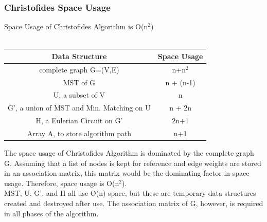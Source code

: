 \documentclass[12pt, oneside]{article}   	%
\begin{document}
\subsubsection {Christofides Space Usage}
\indent\indent\indent Space Usage of Christofides Algorithm is O(n$^2$)\\\\
\begin{center}
\begin{tabular}{|c|c|}
\hline
Data Structure & Space Usage\\
\hline
complete graph G=(V,E) & n+n$^2$\\
\hline
MST of G & n + (n-1)\\
\hline
U, a subset of V & n\\
\hline
G', a union of MST and Min. Matching on U & n + 2n\\
\hline
H, a Eulerian Circuit on G' & 2n+1\\
\hline
Array A, to store algorithm path & n+1\\
\hline
\end{tabular}
\end{center}
\indent\indent The space usage of Christofides Algorithm is dominated by the complete graph G.  Assuming that a list of nodes is kept for reference and edge weights are stored in an association matrix, this matrix would be the dominating factor in space usage.  Therefore, space usage is O(n$^2$).\\
\indent MST, U, G', and H all use O(n) space, but these are temporary data structures created and destroyed after use.  The association matrix of G, however, is required in all phases of the algorithm.\\\\
\end{document}
